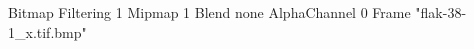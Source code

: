 {Bitmap
	{Filtering 1}
	{Mipmap 1}
	{Blend none}
	{AlphaChannel 0}
	{Frame "flak-38-1_x.tif.bmp"}
}
